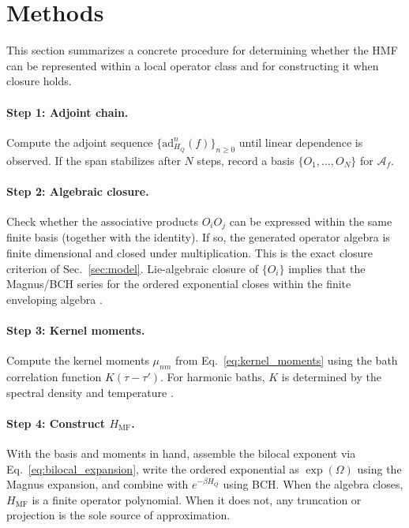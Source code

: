 \section{Methods}
\label{sec:methods}

This section summarizes a concrete procedure for determining whether the HMF
can be represented within a local operator class and for constructing it when
closure holds.

\paragraph{Step 1: Adjoint chain.}
Compute the adjoint sequence
$\{\mathrm{ad}_{H_Q}^n(f)\}_{n\ge 0}$ until linear dependence is observed.
If the span stabilizes after $N$ steps, record a basis
$\{O_1,\ldots,O_N\}$ for $\mathcal{A}_f$.

\paragraph{Step 2: Algebraic closure.}
Check whether the associative products $O_i O_j$ can be expressed within the
same finite basis (together with the identity). If so, the generated operator
algebra is finite dimensional and closed under multiplication. This is the
exact closure criterion of Sec.~\ref{sec:model}. Lie-algebraic closure of
$\{O_i\}$ implies that the Magnus/BCH series for the ordered exponential closes
within the finite enveloping algebra
\cite{weiLieAlgebraicSolution1963,magnusExponentialSolutionDifferential1954a,blanesMagnusExpansionIts2009}.

\paragraph{Step 3: Kernel moments.}
Compute the kernel moments $\mu_{nm}$ from Eq.~\eqref{eq:kernel_moments} using the
bath correlation function $K(\tau-\tau')$. For harmonic baths, $K$ is determined
by the spectral density and temperature
\cite{grabertQuantumBrownianMotion1988,tanimuraReducedHierarchicalEquations2014}.

\paragraph{Step 4: Construct $H_{\mathrm{MF}}$.}
With the basis and moments in hand, assemble the bilocal exponent via
Eq.~\eqref{eq:bilocal_expansion}, write the ordered exponential as
$\exp(\Omega)$ using the Magnus expansion, and combine with $e^{-\beta H_Q}$
using BCH. When the algebra closes, $H_{\mathrm{MF}}$ is a finite operator
polynomial. When it does not, any truncation or projection is the sole source
of approximation.

